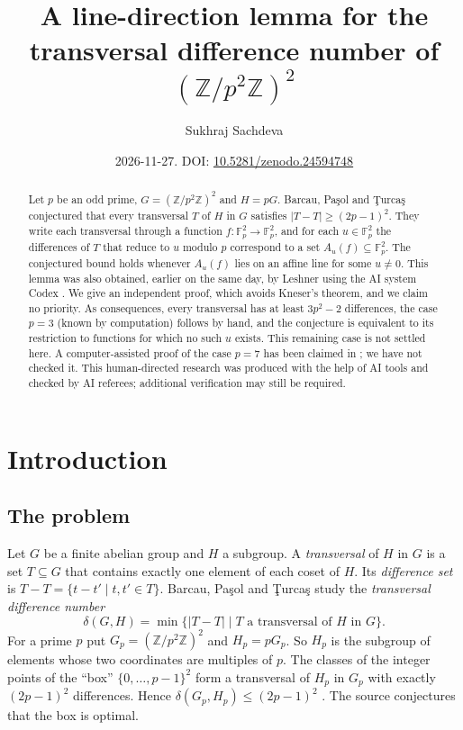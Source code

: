 \documentclass[11pt]{amsart}
\title[A line-direction lemma for transversal differences]{A line-direction lemma for the transversal difference number of $(\mathbb{Z}/p^2\mathbb{Z})^2$}
\author{Sukhraj Sachdeva}
\date{2026-11-27. DOI: \href{https://doi.org/10.5281/zenodo.24594748}{10.5281/zenodo.24594748}}
\theoremstyle{definition}\newtheorem{definition}[theorem]{Definition}
\theoremstyle{remark}\newtheorem{remark}[theorem]{Remark}
\newcommand{\F}{\mathbb{F}}
\newcommand{\Z}{\mathbb{Z}}
\newcommand{\abs}[1]{\lvert #1\rvert}
\begin{document}
\begin{abstract}
Let \(p\) be an odd prime, \(G=(\Z/p^2\Z)^2\) and \(H=pG\).
Barcau, Pa\c{s}ol and \c{T}urca\c{s} conjectured that every transversal \(T\) of \(H\) in \(G\) satisfies \(\abs{T-T}\ge(2p-1)^2\).
They write each transversal through a function \(f\colon\F_p^2\to\F_p^2\), and for each \(u\in\F_p^2\) the differences of \(T\) that reduce to \(u\) modulo \(p\) correspond to a set \(A_u(f)\subseteq\F_p^2\).
The conjectured bound holds whenever \(A_u(f)\) lies on an affine line for some \(u\ne0\).
This lemma was also obtained, earlier on the same day, by Leshner using the AI system Codex \cite{leshner}.
We give an independent proof, which avoids Kneser's theorem, and we claim no priority.
As consequences, every transversal has at least \(3p^2-2\) differences, the case \(p=3\) (known by computation) follows by hand, and the conjecture is equivalent to its restriction to functions for which no such \(u\) exists.
This remaining case is not settled here.
A computer-assisted proof of the case \(p=7\) has been claimed in \cite{leshner}; we have not checked it.
This human-directed research was produced with the help of AI tools and checked by AI referees; additional verification may still be required.
\end{abstract}
\maketitle

\section{Introduction}\label{sec:intro}

\subsection{The problem}
Let \(G\) be a finite abelian group and \(H\) a subgroup.
A \emph{transversal} of \(H\) in \(G\) is a set \(T\subseteq G\) that contains exactly one element of each coset of \(H\).
Its \emph{difference set} is \(T-T=\{t-t'\mid t,t'\in T\}\).
Barcau, Pa\c{s}ol and \c{T}urca\c{s} \cite{BPT} study the \emph{transversal difference number}
\[
\delta(G,H)=\min\{\abs{T-T}\mid T \text{ a transversal of } H \text{ in } G\}.
\]
For a prime \(p\) put \(G_p=(\Z/p^2\Z)^2\) and \(H_p=pG_p\).
So \(H_p\) is the subgroup of elements whose two coordinates are multiples of \(p\).
The classes of the integer points of the ``box'' \(\{0,\dots,p-1\}^2\) form a transversal of \(H_p\) in \(G_p\) with exactly \((2p-1)^2\) differences.
Hence \(\delta(G_p,H_p)\le(2p-1)^2\) \cite[Proposition~5.3]{BPT}.
The source conjectures that the box is optimal.
\end{document}

